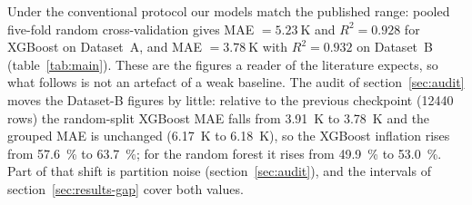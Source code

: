 \documentclass{iopjournal}
\newcommand{\Rsq}{R^{2}}
\begin{document}
Under the conventional protocol our models match the published range: pooled five-fold random
cross-validation gives MAE $=\SI{5.23}{\kelvin}$ and $\Rsq = \num{0.928}$ for XGBoost on Dataset~A,
and MAE $=\SI{3.78}{\kelvin}$ with $\Rsq = \num{0.932}$ on Dataset~B (table~\ref{tab:main}). These
are the figures a reader of the literature expects, so what follows is not an artefact of a weak
baseline. The audit of section~\ref{sec:audit} moves the Dataset-B figures by little: relative to
the previous checkpoint (\num{12440} rows) the random-split XGBoost MAE falls from
\SI{3.91}{\kelvin} to \SI{3.78}{\kelvin} and the grouped MAE is unchanged (\SI{6.17}{\kelvin} to
\SI{6.18}{\kelvin}), so the XGBoost inflation rises from \SI{57.6}{\percent} to
\SI{63.7}{\percent}; for the random forest it rises from \SI{49.9}{\percent} to
\SI{53.0}{\percent}. Part of that shift is partition noise (section~\ref{sec:audit}), and the
intervals of section~\ref{sec:results-gap} cover both values.
\end{document}
